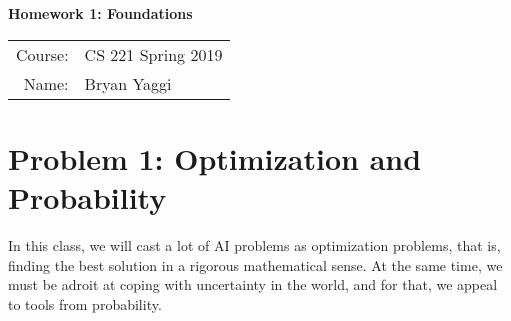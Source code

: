 \documentclass[10pt]{article}
\begin{document}
\begin{center}
{\Large \textbf{Homework 1: Foundations}}

\begin{tabular}{rl}
\\
Course: & CS 221 Spring 2019 \\
Name: & Bryan Yaggi
\end{tabular}
\end{center}

\section*{\normalsize Problem 1: Optimization and Probability}

In this class, we will cast a lot of AI problems as optimization problems, that is, finding the best solution in a rigorous mathematical sense. At the same time, we must be adroit at coping with uncertainty in the world, and for that, we appeal to tools from probability.
\end{document}
